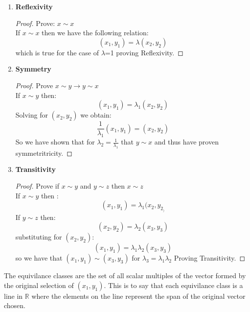 \documentclass[11pt]{article}
\theoremstyle{definition}  %
\newcommand{\R}{\mathbb{R}}
\begin{document}
\begin{enumerate}
\begin{enumerate}
  \item \textbf{Reflexivity}
  \begin{proof}
    Prove: $x\sim x$\\
    If $x\sim x$ then we have the following relation:
    \[
      (x_1,y_1)=\lambda(x_2,y_2)
    \]
    which is true for the case of $\lambda$=1 proving Reflexivity.
  \end{proof}
  \item \textbf{Symmetry}
  \begin{proof}
    Prove $x \sim y \rightarrow y \sim x $\\
    If $x\sim y $ then:
    \[
      (x_1,y_1)=\lambda_1(x_2,y_2)
    \]
    Solving for $(x_2,y_2)$ we obtain:
    \[
      \frac{1}{\lambda_1}(x_1,y_1)=(x_2,y_2)
    \]
    So we have shown that for $\lambda_2=\frac{1}{\lambda_1}$ that $y\sim x $ and thus have proven symmetritricity.
  \end{proof}
  \item \textbf{Transitivity}
  \begin{proof}
      Prove if $x\sim y$ and $y\sim z$ then $x \sim z $\\
      If $x\sim y$ then :
      \[
        (x_1,y_1)=\lambda_1(x_2,y_2_)
      \]
      If $y\sim z$ then:
      \[
        (x_2,y_2)=\lambda_2(x_3,y_3)
      \]
      substituting for $(x_2,y_2)$:
      \[
        (x_1,y_1)=\lambda_1\lambda_2(x_3,y_3)
      \]
      so we have that $(x_1,y_1)\sim (x_3,y_3)$ for $\lambda_3=\lambda_1\lambda_2$ Proving Transitivity.
  \end{proof}
\end{enumerate}
 \end{enumerate}
The equivilance classes are the set of all scalar multiples of the vector formed by the original selection of $(x_1,y_1)$. This is to say that each equivilance class is a line in $\R$ where the elements on the line represent the span of the original vector chosen.
\end{document}
